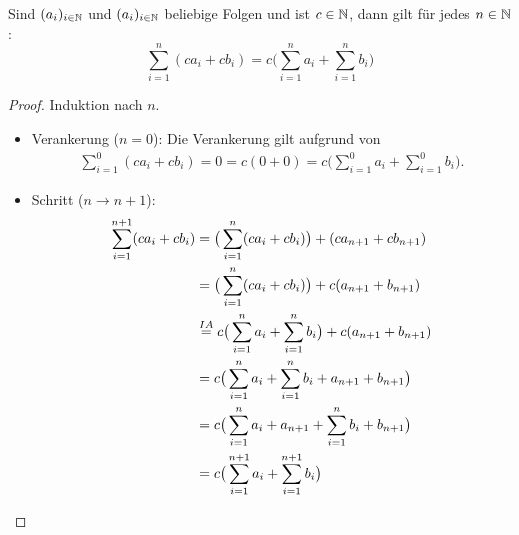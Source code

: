 \begin{satz}\label{satz:partialsummen}
 Sind $(a_i)_{i\in\mathbb{N}}$ und $(a_i)_{i\in\mathbb{N}}$ beliebige Folgen und ist $c\in\mathbb{N}$, dann gilt für jedes $n\in\mathbb{N}$:
\[
 \sum_{i=1}^n(ca_i+cb_i)=c\big(\sum_{i=1}^na_i+\sum_{i=1}^nb_i\big)
\]
\end{satz}
\begin{proof}
 Induktion nach $n$.
 \begin{itemize}
 \item Verankerung ($n=0$): Die Verankerung gilt aufgrund von
 \begin{align*}
\sum_{i=1}^0(ca_i+cb_i)=0=c(0+0)=c\big(\sum_{i=1}^0a_i+\sum_{i=1}^0b_i\big).
 \end{align*}
 \item Schritt ($n\to n+1$):
 \begin{align*}
\sum_{i=1}^{n+1}(ca_i+cb_i)&=\big(\sum_{i=1}^n(ca_i+cb_i)\big)+(ca_{n+1}+cb_{n+1})\\
&=\big(\sum_{i=1}^n(ca_i+cb_i)\big)+c(a_{n+1}+b_{n+1})\\
&\stackrel{IA}{=}c\big(\sum_{i=1}^na_i+\sum_{i=1}^nb_i\big)+c(a_{n+1}+b_{n+1})\\
&=c\big( \sum_{i=1}^na_i+\sum_{i=1}^nb_i+a_{n+1}+b_{n+1} \big)\\
&=c\big( \sum_{i=1}^na_i+a_{n+1}+\sum_{i=1}^nb_i+b_{n+1} \big)\\
&=c\big( \sum_{i=1}^{n+1}a_i+\sum_{i=1}^{n+1}b_i\big)\qedhere
 \end{align*}
 \end{itemize}
\end{proof}

